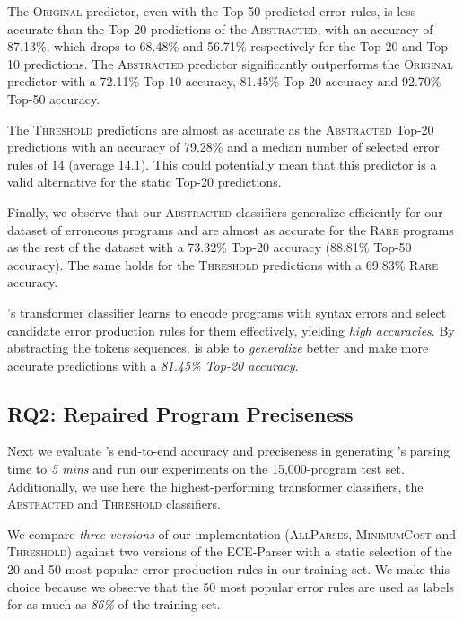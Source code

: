 The \textsc{Original} predictor, even with the Top-50 predicted error rules, is
less accurate than the Top-20 predictions of the \textsc{Abstracted}, with an
accuracy of 87.13\%, which drops to 68.48\% and 56.71\% respectively for the
Top-20 and Top-10 predictions. The \textsc{Abstracted} predictor significantly
outperforms the \textsc{Original} predictor with a 72.11\% Top-10 accuracy,
81.45\% Top-20 accuracy and 92.70\% Top-50 accuracy.

The \textsc{Threshold} predictions are almost as accurate as the
\textsc{Abstracted} Top-20 predictions with an accuracy of 79.28\% and a median
number of selected error rules of 14 (average 14.1). This could potentially mean
that this predictor is a valid alternative for the static Top-20 predictions.

Finally, we observe that our \textsc{Abstracted} classifiers generalize
efficiently for our dataset of erroneous \python programs and are almost as
accurate for the \textsc{Rare} programs as the rest of the dataset with a
73.32\% Top-20 accuracy (88.81\% Top-50 accuracy). The same holds for the
\textsc{Threshold} predictions with a 69.83\% \textsc{Rare} accuracy.

\begin{framed}
  \noindent \toolname's transformer classifier learns to encode programs with
  syntax errors and select candidate error production rules for them
  effectively, yielding \emph{high accuracies}. By abstracting the tokens
  sequences, \toolname is able to \emph{generalize} better and make more
  accurate predictions with a \emph{81.45\% Top-20 accuracy}.
\end{framed}


\subsection{RQ2: Repaired Program Preciseness}
\label{sec:eval:precise}

Next we evaluate \toolname's end-to-end accuracy and preciseness in generating
\toolname's parsing time to \emph{5 mins} and run our experiments on the
15,000-program test set. Additionally, we use here the highest-performing
transformer classifiers, \ie the \textsc{Abstracted} and \textsc{Threshold}
classifiers.

We compare \emph{three versions} of our \toolname implementation
(\textsc{AllParses}, \textsc{MinimumCost} and \textsc{Threshold}) against two
versions of the ECE-Parser with a static selection of the 20 and 50 most popular
error production rules in our training set. We make this choice because we
observe that the 50 most popular error rules are used as labels for as much as
\emph{86\%} of the training set.

